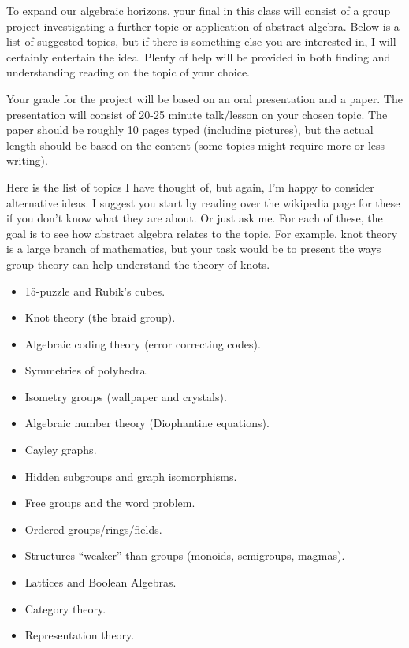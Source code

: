 \documentclass[12pt,letterpaper]{article}
\begin{document}
To expand our algebraic horizons, your final in this class will consist of a group project investigating a further topic or application of abstract algebra.   Below is a list of suggested topics, but if there is something else you are interested in, I will certainly entertain the idea.  Plenty of help will be provided in both finding and understanding reading on the topic of your choice.  


Your grade for the project will be based on an oral presentation and a paper.  The presentation will consist of 20-25 minute talk/lesson on your chosen topic.  The paper should be roughly 10 pages typed (including pictures), but the actual length should be based on the content (some topics might require more or less writing).  



Here is the list of topics I have thought of, but again, I'm happy to consider alternative ideas.  I suggest you start by reading over the wikipedia page for these if you don't know what they are about.  Or just ask me.  For each of these, the goal is to see how abstract algebra relates to the topic.  For example, knot theory is a large branch of mathematics, but your task would be to present the ways group theory can help understand the theory of knots.


\begin{multicols}{1}
\begin{itemize}
\item 15-puzzle and Rubik's cubes.
\item Knot theory (the braid group).
\item Algebraic coding theory (error correcting codes).
\item Symmetries of polyhedra.
\item Isometry groups (wallpaper and crystals).
\item Algebraic number theory (Diophantine equations).
\item Cayley graphs.
\item Hidden subgroups and graph isomorphisms.
\item Free groups and the word problem.
\item Ordered groups/rings/fields.
\item Structures ``weaker'' than groups (monoids, semigroups, magmas).
\item Lattices and Boolean Algebras.
\item Category theory.
\item Representation theory.


\end{itemize}

\end{multicols}
\end{document}
